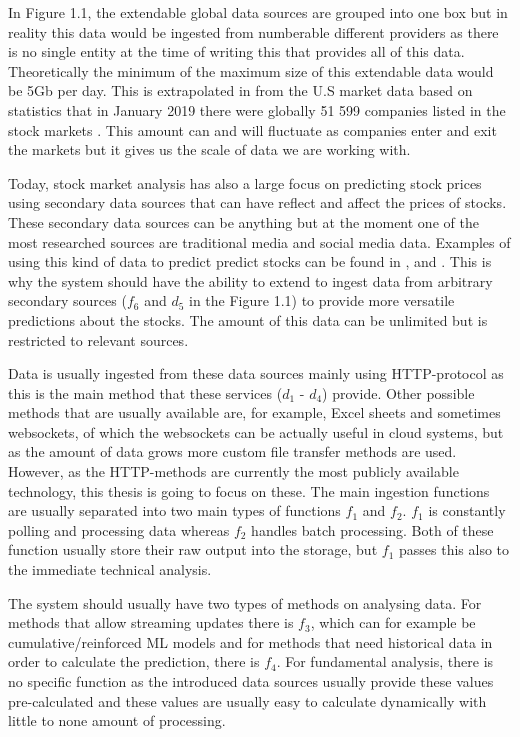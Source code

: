 In Figure 1.1, the extendable global data sources are grouped into one box but in reality this data would be ingested from numberable different providers as there is no single entity at the time of writing this that provides all of this data.
Theoretically the minimum of the maximum size of this extendable data would be 5Gb per day.
This is extrapolated in from the U.S market data based on statistics that in January 2019 there were globally 51 599 companies listed in the stock markets \cite{global}.
This amount can and will fluctuate as companies enter and exit the markets but it gives us the scale of data we are working with.

Today, stock market analysis has also a large focus on predicting stock prices using secondary data sources that can have reflect and affect the prices of stocks. 
These secondary data sources can be anything but at the moment one of the most researched sources are traditional media and social media data.
Examples of using this kind of data to predict predict stocks can be found in \cite{kao}, \cite{skuza} and \cite{wai}.
This is why the system should have the ability to extend to ingest data from arbitrary secondary sources ($f_6$ and $d_5$ in the Figure 1.1) to provide more versatile predictions about the stocks.
The amount of this data can be unlimited but is restricted to relevant sources.

Data is usually ingested from these data sources mainly using HTTP-protocol as this is the main method that these services ($d_1$ - $d_4$) provide.
Other possible methods that are usually available are, for example, Excel sheets and sometimes websockets, of which the websockets can be actually useful in cloud systems, but as the amount of data grows more custom file transfer methods are used.
However, as the HTTP-methods are currently the most publicly available technology, this thesis is going to focus on these.
The main ingestion functions are usually separated into two main types of functions $f_1$ and $f_2$. 
$f_1$ is constantly polling and processing data whereas $f_2$ handles batch processing.
Both of these function usually store their raw output into the storage, but $f_1$ passes this also to the immediate technical analysis.

The system should usually have two types of methods on analysing data.
For methods that allow streaming updates there is $f_3$, which can for example be cumulative/reinforced ML models and for methods that need historical data in order to calculate the prediction, there is $f_4$.
For fundamental analysis, there is no specific function as the introduced data sources usually provide these values pre-calculated and these values are usually easy to calculate dynamically with little to none amount of processing.

